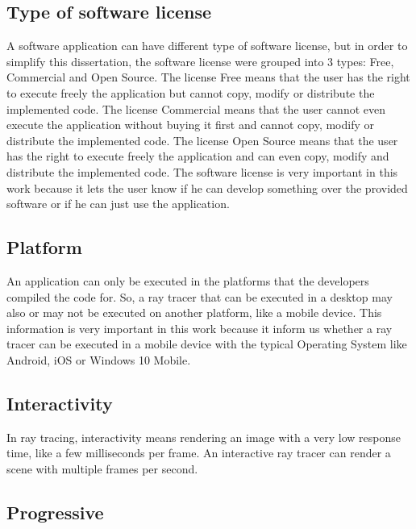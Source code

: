 \subsection{Type of software license}

\par
A software application can have different type of software license, but in order to simplify this dissertation, the software license were grouped into 3 types: Free, Commercial and Open Source.
The license Free means that the user has the right to execute freely the application but cannot copy, modify or distribute the implemented code.
The license Commercial means that the user cannot even execute the application without buying it first and cannot copy, modify or distribute the implemented code.
The license Open Source means that the user has the right to execute freely the application and can even copy, modify and distribute the implemented code.
The software license is very important in this work because it lets the user know if he can develop something over the provided software or if he can just use the application.

\subsection{Platform}

\par
An application can only be executed in the platforms that the developers compiled the code for.
So, a ray tracer that can be executed in a desktop may also or may not be executed on another platform, like a mobile device.
This information is very important in this work because it inform us whether a ray tracer can be executed in a mobile device with the typical Operating System like Android, iOS or Windows 10 Mobile.

\subsection{Interactivity}

\par
In ray tracing, interactivity means rendering an image with a very low response time, like a few milliseconds per frame.
An interactive ray tracer can render a scene with multiple frames per second.

\subsection{Progressive}

